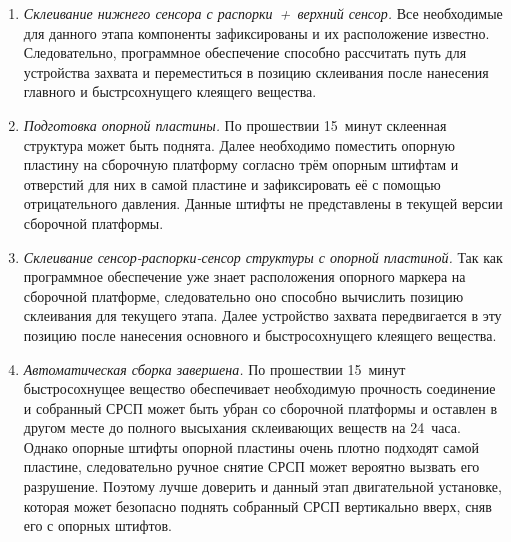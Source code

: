 \begin{enumerate}
\item \emph{Склеивание нижнего сенсора с распорки~+~верхний сенсор.} Все необходимые для данного этапа компоненты зафиксированы и их расположение известно. Следовательно, программное обеспечение способно рассчитать путь для устройства захвата и переместиться в позицию склеивания после нанесения главного и быстрсохнущего клеящего вещества.
\item \emph{Подготовка опорной пластины.} По прошествии 15~минут склеенная структура может быть поднята. Далее необходимо поместить опорную пластину на сборочную платформу согласно трём опорным штифтам и отверстий для них в самой пластине и зафиксировать её с помощью отрицательного давления. Данные штифты не представлены в текущей версии сборочной платформы.
\item \emph{Склеивание сенсор-распорки-сенсор структуры с опорной пластиной.} Так как программное обеспечение уже знает расположения опорного маркера на сборочной платформе, следовательно оно способно вычислить позицию склеивания для текущего этапа. Далее устройство захвата передвигается в эту позицию после нанесения основного и быстросохнущего клеящего вещества.
\item \emph{Автоматическая сборка завершена.} По прошествии 15~минут быстросохнущее вещество обеспечивает необходимую прочность соединение и собранный СРСП может быть убран со сборочной платформы и оставлен в другом месте до полного высыхания склеивающих веществ на 24~часа. Однако опорные штифты опорной пластины очень плотно подходят самой пластине, следовательно ручное снятие СРСП может вероятно вызвать его разрушение. Поэтому лучше доверить и данный этап двигательной установке, которая может безопасно поднять собранный СРСП вертикально вверх, сняв его с опорных штифтов.
\end{enumerate}